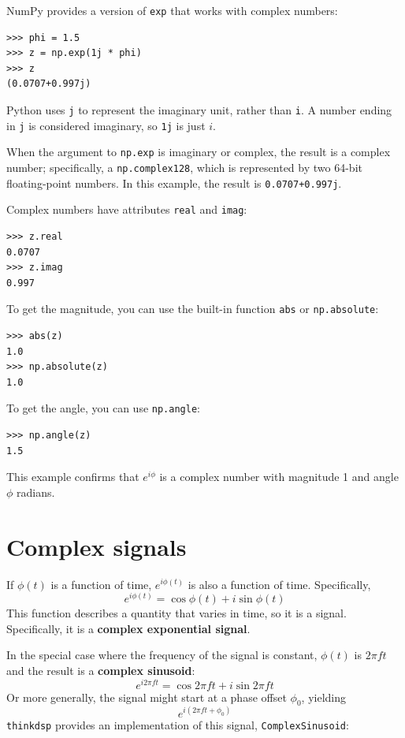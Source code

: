 \documentclass[12pt]{book}
\begin{document}
NumPy provides a version of {\tt exp} that works with complex numbers:

\begin{verbatim}
>>> phi = 1.5
>>> z = np.exp(1j * phi)
>>> z
(0.0707+0.997j)
\end{verbatim}

Python uses {\tt j} to represent the imaginary unit, rather
than {\tt i}.  A number ending in {\tt j} is considered imaginary,
so {\tt 1j} is just $i$.

When the argument to {\tt np.exp} is imaginary or complex, the
result is a complex number; specifically, a {\tt np.complex128},
which is represented by two 64-bit floating-point numbers.
In this example, the result is {\tt 0.0707+0.997j}.  

Complex numbers have attributes {\tt real} and {\tt imag}:

\begin{verbatim}
>>> z.real
0.0707
>>> z.imag
0.997
\end{verbatim}

To get the magnitude, you can use the built-in function {\tt abs}
or {\tt np.absolute}:

\begin{verbatim}
>>> abs(z)
1.0
>>> np.absolute(z)
1.0
\end{verbatim}

To get the angle, you can use {\tt np.angle}:

\begin{verbatim}
>>> np.angle(z)
1.5
\end{verbatim}

This example confirms that $e^{i \phi}$ is a complex number with
magnitude 1 and angle $\phi$ radians.


\section{Complex signals}

If $\phi(t)$ is a function of time, $e^{i \phi(t)}$ is also a function
of time.  Specifically,
%
\[ e^{i \phi(t)} = \cos \phi(t) + i \sin \phi(t) \]
%
This function describes a quantity that varies in time, so it is
a signal.  Specifically, it is a {\bf complex exponential signal}.

In the special case where the frequency of the signal is constant,
$\phi(t)$ is $2 \pi f t$ and the result is a {\bf complex sinusoid}:
%
\[ e^{i 2 \pi f t} = \cos 2 \pi f t + i \sin 2 \pi f t \]
%
Or more generally, the signal might start at a phase offset
$\phi_0$, yielding
%
\[ e^{i (2 \pi f t + \phi_0)} \]
%
{\tt thinkdsp} provides an implementation of this signal,
{\tt ComplexSinusoid}:
\end{document}
